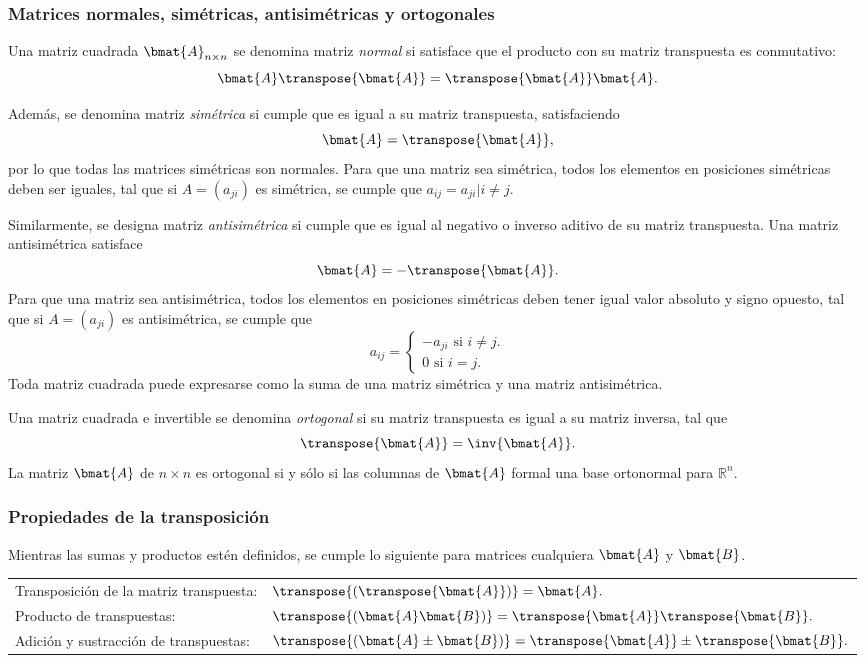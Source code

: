 \documentclass{fmbnotes}
\begin{document}
\subsubsection{Matrices normales, simétricas, antisimétricas y ortogonales}

Una matriz cuadrada \(\bmat{A}_{n \times n}\) se denomina matriz \emph{normal} si satisface que el producto con su matriz transpuesta es conmutativo: \[\bmat{A}\transpose{\bmat{A}}=\transpose{\bmat{A}}\bmat{A}.\]

Además, se denomina matriz \emph{simétrica} si cumple que es igual a su matriz transpuesta, satisfaciendo
\[\bmat{A}=\transpose{\bmat{A}},\]
por lo que todas las matrices simétricas son normales. Para que una matriz sea simétrica, todos los elementos en posiciones simétricas deben ser iguales, tal que si \(A=(a_{ji})\) es simétrica, se cumple que \(a_{ij}=a_{ji}|i\neq j\).

Similarmente, se designa matriz \emph{antisimétrica} si cumple que es igual al negativo o inverso aditivo de su matriz transpuesta. Una matriz antisimétrica satisface 
\[\bmat{A}=-\transpose{\bmat{A}}.\] 
Para que una matriz sea antisimétrica, todos los elementos en posiciones simétricas deben tener igual valor absoluto y signo opuesto, tal que si \(A=(a_{ji})\) es antisimétrica, se cumple que 
\[a_{ij}=\begin{cases}
-a_{ji} \text{ si } i\neq j. \\
0 \text{ si } i= j.
\end{cases}\]
Toda matriz cuadrada puede expresarse como la suma de una matriz simétrica y una matriz antisimétrica. 

Una matriz cuadrada e invertible se denomina \emph{ortogonal} si su matriz transpuesta es igual a su matriz inversa, tal que \[\transpose{\bmat{A}}=\inv{\bmat{A}}.\]
La matriz \(\bmat{A}\) de \(n\times n \) es ortogonal si y sólo si las columnas de \(\bmat{A}\) formal una base ortonormal para \(\mathbb{R}^{n}\).

\subsubsection{Propiedades de la transposición}
Mientras las sumas y productos estén definidos, se cumple lo siguiente para matrices cualquiera \(\bmat{A}\) y \(\bmat{B}\).
\begin{tabular}{lp{}}
	\rule[1ex]{0pt}{2.5ex} Transposición de la matriz transpuesta: &  \(\transpose{\left(\transpose{\bmat{A}}\right)}=\bmat{A}.\) \\
	\rule[1ex]{0pt}{2.5ex} Producto de transpuestas: &  \(\transpose{(\bmat{A}\bmat{B})}=\transpose{\bmat{A}}\transpose{\bmat{B}}.\)   \\
	\rule[1ex]{0pt}{2.5ex} Adición y sustracción de transpuestas: &  \(\transpose{(\bmat{A}\pm \bmat{B})}=\transpose{\bmat{A}}\pm\transpose{\bmat{B}}.\)  
\end{tabular}
\end{document}
